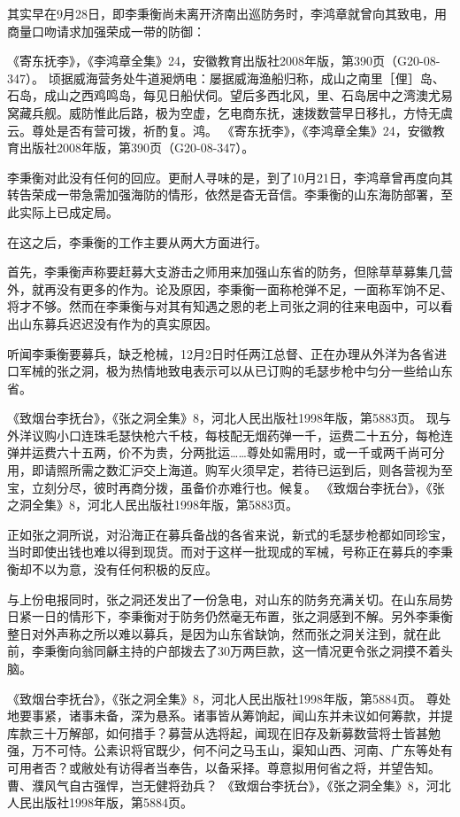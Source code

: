 \documentclass[12pt,UTF8]{ctexbook}
\begin{document}
其实早在9月28日，即李秉衡尚未离开济南出巡防务时，李鸿章就曾向其致电，用商量口吻请求加强荣成一带的防御：

《寄东抚李》，《李鸿章全集》24，安徽教育出版社2008年版，第390页（G20-08-347）。
顷据威海营务处牛道昶炳电：屡据威海渔船归称，成山之南里［俚］岛、石岛，成山之西鸡鸣岛，每见日船伏伺。望后多西北风，里、石岛居中之湾澳尤易窝藏兵舰。威防惟此后路，极为空虚，乞电商东抚，速拨数营早日移扎，方恃无虞云。尊处是否有营可拨，祈酌复。鸿。 《寄东抚李》，《李鸿章全集》24，安徽教育出版社2008年版，第390页（G20-08-347）。

李秉衡对此没有任何的回应。更耐人寻味的是，到了10月21日，李鸿章曾再度向其转告荣成一带急需加强海防的情形，依然是杳无音信。李秉衡的山东海防部署，至此实际上已成定局。

在这之后，李秉衡的工作主要从两大方面进行。

首先，李秉衡声称要赶募大支游击之师用来加强山东省的防务，但除草草募集几营外，就再没有更多的作为。论及原因，李秉衡一面称枪弹不足，一面称军饷不足、将才不够。然而在李秉衡与对其有知遇之恩的老上司张之洞的往来电函中，可以看出山东募兵迟迟没有作为的真实原因。

听闻李秉衡要募兵，缺乏枪械，12月2日时任两江总督、正在办理从外洋为各省进口军械的张之洞，极为热情地致电表示可以从已订购的毛瑟步枪中匀分一些给山东省。

《致烟台李抚台》，《张之洞全集》8，河北人民出版社1998年版，第5883页。
现与外洋议购小口连珠毛瑟快枪六千枝，每枝配无烟药弹一千，运费二十五分，每枪连弹并运费六十五两，价不为贵，分两批运……尊处如需用时，或一千或两千尚可分用，即请照所需之数汇沪交上海道。购军火须早定，若待已运到后，则各营视为至宝，立刻分尽，彼时再商分拨，虽备价亦难行也。候复。 《致烟台李抚台》，《张之洞全集》8，河北人民出版社1998年版，第5883页。

正如张之洞所说，对沿海正在募兵备战的各省来说，新式的毛瑟步枪都如同珍宝，当时即使出钱也难以得到现货。而对于这样一批现成的军械，号称正在募兵的李秉衡却不以为意，没有任何积极的反应。

与上份电报同时，张之洞还发出了一份急电，对山东的防务充满关切。在山东局势日紧一日的情形下，李秉衡对于防务仍然毫无布置，张之洞感到不解。另外李秉衡整日对外声称之所以难以募兵，是因为山东省缺饷，然而张之洞关注到，就在此前，李秉衡向翁同龢主持的户部拨去了30万两巨款，这一情况更令张之洞摸不着头脑。

《致烟台李抚台》，《张之洞全集》8，河北人民出版社1998年版，第5884页。
尊处地要事紧，诸事未备，深为悬系。诸事皆从筹饷起，闻山东并未议如何筹款，并提库款三十万解部，如何措手？募营从选将起，闻现在旧存及新募数营将士皆甚勉强，万不可恃。公素识将官既少，何不问之马玉山，渠知山西、河南、广东等处有可用者否？或敝处有访得者当奉告，以备采择。尊意拟用何省之将，并望告知。曹、濮风气自古强悍，岂无健将劲兵？ 《致烟台李抚台》，《张之洞全集》8，河北人民出版社1998年版，第5884页。
\end{document}
